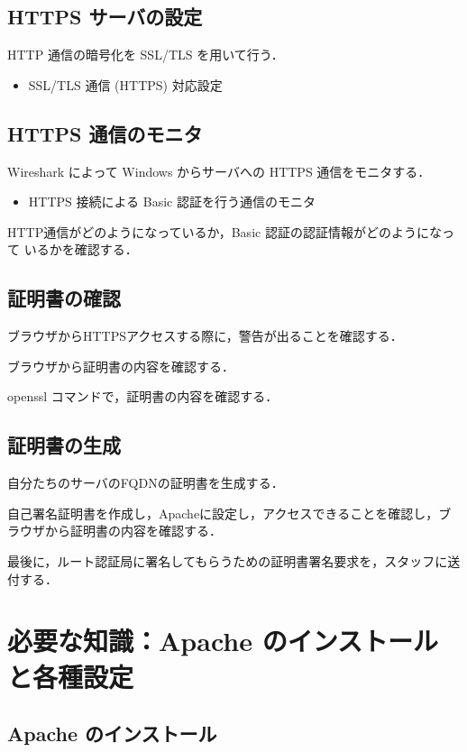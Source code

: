 \subsection{HTTPS サーバの設定}

HTTP 通信の暗号化を SSL/TLS を用いて行う．

\begin{itemize}
\item SSL/TLS 通信 (HTTPS) 対応設定
\end{itemize}

\subsection{HTTPS 通信のモニタ}

Wireshark によって Windows からサーバへの HTTPS 通信をモニタする．
\begin{itemize}
 \item HTTPS 接続による Basic 認証を行う通信のモニタ
\end{itemize}

HTTP通信がどのようになっているか，Basic 認証の認証情報がどのようになって
いるかを確認する．


\subsection{証明書の確認}

ブラウザからHTTPSアクセスする際に，警告が出ることを確認する．

ブラウザから証明書の内容を確認する．

openssl コマンドで，証明書の内容を確認する．

\subsection{証明書の生成}

自分たちのサーバのFQDNの証明書を生成する．

自己署名証明書を作成し，Apacheに設定し，アクセスできることを確認し，ブラウザから証明書の内容を確認する．

最後に，ルート認証局に署名してもらうための証明書署名要求を，スタッフに送付する．


\section{必要な知識：Apache のインストールと各種設定}

\subsection{Apache のインストール}

